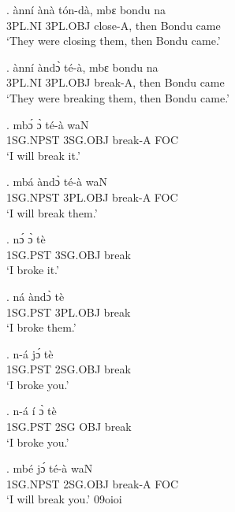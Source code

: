\documentclass{assets/fieldnotes}
\begin{document}
\exg.
ànní     ànà       tón-dà,    mbɛ    bondu   na   \\
3PL.NI   3PL.OBJ   close-A,   then   Bondu   came \\%
`They were closing them, then Bondu came.'

\exg.
ànní     àndɔ̀      té-à,      mbɛ    bondu   na   \\
3PL.NI   3PL.OBJ   break-A,   then   Bondu   came \\%
`They were breaking them, then Bondu came.'

\exg.
mbɔ́        ɔ̀         té-à      waN \\
1SG.NPST   3SG.OBJ   break-A   FOC \\%
`I will break it.'

\exg.
mbá        àndɔ̀      té-à      waN \\
1SG.NPST   3PL.OBJ   break-A   FOC \\%
`I will break them.'

\exg.
nɔ́        ɔ̀         tè    \\
1SG.PST   3SG.OBJ   break \\%
`I broke it.'

\exg.
ná        àndɔ̀      tè    \\
1SG.PST   3PL.OBJ   break \\%
`I broke them.'

\exg.
n-á        jɔ́        tè    \\
1SG.PST   2SG.OBJ   break \\%
`I broke you.'


\exg.
n-á        í     ɔ̀     tè    \\
1SG.PST   2SG   OBJ   break \\%
`I broke you.' \label{14438}

\exg.
mbé        jɔ́        té-à      waN \\
1SG.NPST   2SG.OBJ   break-A   FOC \\%
`I will break you.'
09oioi
\end{document}
